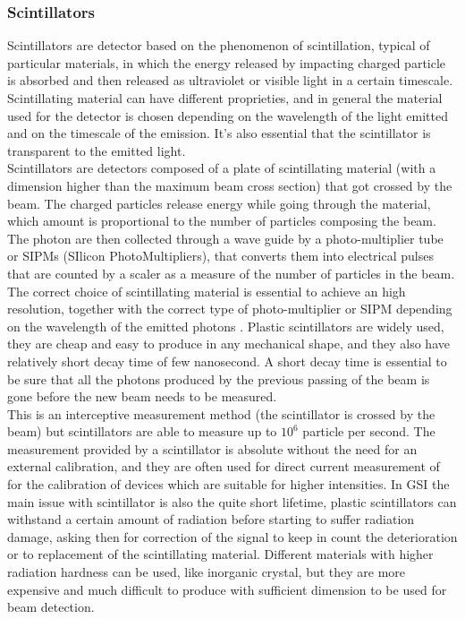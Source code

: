 \documentclass[12pt,a4paper]{report}
\begin{document}
	\subsubsection{Scintillators}
	Scintillators are detector based on the phenomenon of scintillation, typical of particular materials, in which the energy released by impacting charged particle is absorbed and then released as ultraviolet or visible light in a certain timescale. Scintillating material can have different proprieties, and in general the material used for the detector is chosen depending on the wavelength of the light emitted and on the timescale of the emission. It's also essential that the scintillator is transparent to the emitted light. \\
	Scintillators are detectors composed of a plate of scintillating material (with a dimension higher than the maximum beam cross section) that got crossed by the beam. The charged particles release energy while going through the material, which amount is proportional to the number of particles composing the beam. The photon are then collected through a wave guide by a photo-multiplier tube or SIPMs (SIlicon PhotoMultipliers), that converts them into electrical pulses that are counted by a scaler as a measure of the number of particles in the beam.\\
	The correct choice of scintillating material is essential to achieve an high resolution, together with the correct type of photo-multiplier or SIPM depending on the wavelength of the emitted photons \cite{Scintillators}. Plastic scintillators are widely used, they are cheap and easy to produce in any mechanical shape, and they also have relatively short decay time of few nanosecond. A short decay time is essential to be sure that all the photons produced by the previous passing of the beam is gone before the new beam needs to be measured. \\
	This is an interceptive measurement method (the scintillator is crossed by the beam) but scintillators are able to measure up to $10^6$ particle per second. The measurement provided by a scintillator is absolute without the need for an external calibration, and they are often used for direct current measurement of for the calibration of devices which are suitable for higher intensities. In GSI the main issue with scintillator is also the quite short lifetime, plastic scintillators can withstand a certain amount of radiation before starting to suffer radiation damage, asking then for correction of the signal to keep in count the deterioration or to replacement of the scintillating material. Different materials with higher radiation hardness can be used, like inorganic crystal, but they are more expensive and much difficult to produce with sufficient dimension to be used for beam detection.
\end{document}
